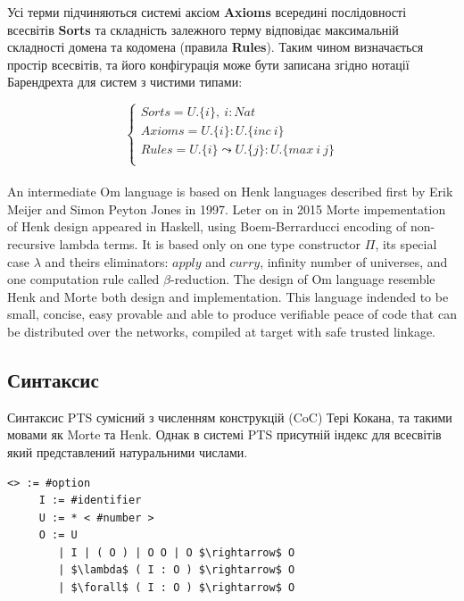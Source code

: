 \begin{definition}
\begin{definition}
\begin{definition}
\begin{definition}
Усі терми підчиняються системі аксіом {\bf Axioms} всередині
послідовності всесвітів {\bf Sorts} та складність залежного
терму відповідає максимальній складності домена та кодомена
(правила {\bf Rules}). Таким чином визначається простір всесвітів,
та його конфігурація може бути записана згідно нотації
Барендрехта для систем з чистими типами:

$$
\begin{cases}
Sorts = U.\{i\},\ i : Nat\\
Axioms = U.\{i\} : U.\{inc\ i\}\\
Rules = U.\{i\} \leadsto U.\{j\} : U.\{max\ i\ j\}\\
\end{cases}
$$

\paragraph{}
An intermediate Om language is based on Henk\cite{Erik97} languages described first
by Erik Meijer and Simon Peyton Jones in 1997. Leter on in 2015 Morte impementation
of Henk design appeared in Haskell, using Boem-Berrarducci encoding of non-recursive lambda terms.
It is based only on one type constructor $\Pi$, its special case $\lambda$ and theirs eliminators:
$apply$ and $curry$, infinity number of universes,
and one computation rule called $\beta$-reduction.
The design of Om language resemble Henk and Morte both
design and implementation. This language indended to be small, concise, easy provable
and able to produce verifiable peace of code that can be distributed over the networks,
compiled at target with safe trusted linkage.

\newpage
\subsection{Синтаксис}

Синтаксис PTS сумісний з численням конструкцій (CoC) Тері Кокана,
та такими мовами як Morte та Henk.
Однак в системі PTS присутній індекс для всесвітів який
представлений натуральними числами.

\vspace{0.5cm}
\begin{lstlisting}[mathescape=true]
    <> := #option
     I := #identifier
     U := * < #number >
     O := U
        | I | ( O ) | O O | O $\rightarrow$ O
        | $\lambda$ ( I : O ) $\rightarrow$ O
        | $\forall$ ( I : O ) $\rightarrow$ O
\end{lstlisting}


\end{definition}
\end{definition}
\end{definition}
\end{definition}

